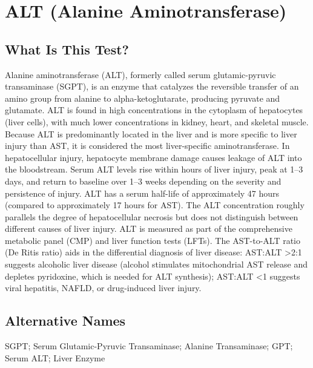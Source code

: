 \chapter{ALT (Alanine Aminotransferase)}

\section*{What Is This Test?}
Alanine aminotransferase (ALT), formerly called serum glutamic-pyruvic transaminase (SGPT), is an enzyme that catalyzes the reversible transfer of an amino group from alanine to alpha-ketoglutarate, producing pyruvate and glutamate. ALT is found in high concentrations in the cytoplasm of hepatocytes (liver cells), with much lower concentrations in kidney, heart, and skeletal muscle. Because ALT is predominantly located in the liver and is more specific to liver injury than AST, it is considered the most liver-specific aminotransferase. In hepatocellular injury, hepatocyte membrane damage causes leakage of ALT into the bloodstream. Serum ALT levels rise within hours of liver injury, peak at 1--3 days, and return to baseline over 1--3 weeks depending on the severity and persistence of injury. ALT has a serum half-life of approximately 47 hours (compared to approximately 17 hours for AST). The ALT concentration roughly parallels the degree of hepatocellular necrosis but does not distinguish between different causes of liver injury. ALT is measured as part of the comprehensive metabolic panel (CMP) and liver function tests (LFTs). The AST-to-ALT ratio (De Ritis ratio) aids in the differential diagnosis of liver disease: AST:ALT >2:1 suggests alcoholic liver disease (alcohol stimulates mitochondrial AST release and depletes pyridoxine, which is needed for ALT synthesis); AST:ALT <1 suggests viral hepatitis, NAFLD, or drug-induced liver injury.

\section*{Alternative Names}
SGPT; Serum Glutamic-Pyruvic Transaminase; Alanine Transaminase; GPT; Serum ALT; Liver Enzyme

